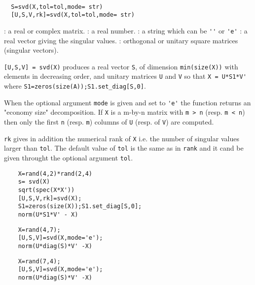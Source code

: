 \begin{mandesc}
   \\ %
\end{mandesc}
\begin{calling_sequence}
\begin{verbatim}
  S=svd(X,tol=tol,mode= str)  
  [U,S,V,rk]=svd(X,tol=tol,mode= str)  
\end{verbatim}
\end{calling_sequence}
\begin{parameters}
  \begin{varlist}
    : a real or complex matrix.
    : a real number.
    : a string which can be \verb!''! or \verb!'e'!
    : a real vector giving the singular values.
    : orthogonal or unitary square matrices (singular vectors).
  \end{varlist}
\end{parameters}
\begin{mandescription}
  \verb![U,S,V] = svd(X)! produces a real vector \verb!S!, of dimension 
  \verb!min(size(X))! with elements in decreasing order, and unitary
  matrices \verb!U! and \verb!V! so that \verb!X = U*S1*V'! where 
  \verb!S1=zeros(size(A));S1.set_diag[S,0]!. 
  
  When the optional argument \verb!mode! is given and set to \verb!'e'! 
  the function returns an "economy size" decomposition. 
  If \verb!X! is a m-by-n matrix with \verb!m > n! (resp. \verb!m < n!) 
  then only the first \verb!n! (resp. \verb!m!) 
  columns of \verb!U! (resp. of \verb!V!) are computed. 

  \verb!rk! gives in addition the numerical rank of \verb!X! i.e. the number of
  singular values larger than \verb!tol!. The default value of \verb!tol!  is
  the same as in \verb!rank! and it cand be given throught the optional argument
  \verb!tol!.
\end{mandescription}
\begin{examples}
  \begin{Verbatim}
    X=rand(4,2)*rand(2,4)
    s= svd(X)
    sqrt(spec(X*X'))
    [U,S,V,rk]=svd(X);
    S1=zeros(size(X));S1.set_diag[S,0];
    norm(U*S1*V' - X)
  \end{Verbatim}
  \begin{Verbatim}
    X=rand(4,7);
    [U,S,V]=svd(X,mode='e');
    norm(U*diag(S)*V' -X) 
  \end{Verbatim}
  \begin{Verbatim}
    X=rand(7,4);
    [U,S,V]=svd(X,mode='e');
    norm(U*diag(S)*V' -X) 
  \end{Verbatim}
\end{examples}
\begin{manseealso}
         
\end{manseealso}

